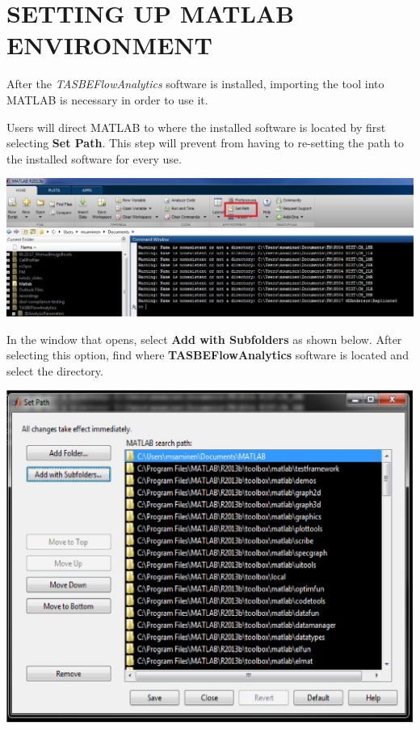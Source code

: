 \section*{SETTING UP MATLAB ENVIRONMENT}

After the \textit{TASBEFlowAnalytics} software is installed, importing the tool into MATLAB is necessary in order to use it. 

Users will direct MATLAB to where the installed software is located by first selecting \textbf{Set Path}. This step will prevent from having to re-setting the path to the installed software for every use. 

\begin{center}
  \includegraphics[width=.90\textwidth]{figures/Set_Path_Fig}
\end{center}


In the window that opens, select \textbf{Add with Subfolders} as shown below. After selecting this option, find where \textbf{TASBEFlowAnalytics} software is located and select the directory.    

\begin{center}
  \includegraphics[width=.90\textwidth]{figures/Adding_SubFolders}
\end{center}

